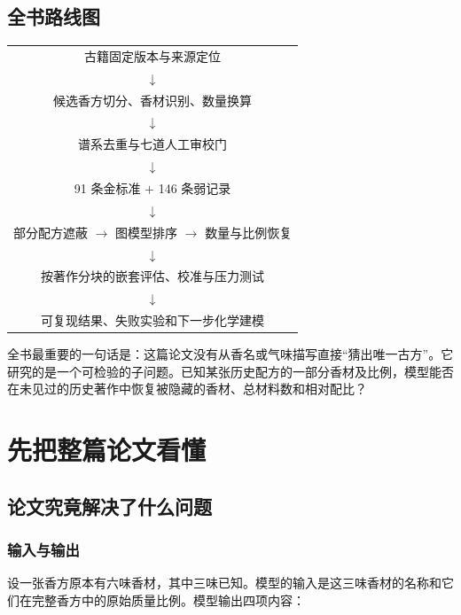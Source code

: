 \documentclass[UTF8,11pt,openany,fontset=none]{ctexbook}
\renewcommand{\arraystretch}{1.18}
\newenvironment{keybox}{\begin{leftbar}\small\noindent}{\end{leftbar}}
\begin{document}
\tableofcontents

\chapter*{全书路线图}

\begin{center}
\renewcommand{\arraystretch}{1.35}
\begin{tabular}{c}
古籍固定版本与来源定位\\
$\downarrow$\\
候选香方切分、香材识别、数量换算\\
$\downarrow$\\
谱系去重与七道人工审校门\\
$\downarrow$\\
91 条金标准 $+$ 146 条弱记录\\
$\downarrow$\\
部分配方遮蔽 $\rightarrow$ 图模型排序 $\rightarrow$ 数量与比例恢复\\
$\downarrow$\\
按著作分块的嵌套评估、校准与压力测试\\
$\downarrow$\\
可复现结果、失败实验和下一步化学建模
\end{tabular}
\end{center}

\begin{keybox}
全书最重要的一句话是：这篇论文没有从香名或气味描写直接“猜出唯一古方”。它研究的是一个可检验的子问题。已知某张历史配方的一部分香材及比例，模型能否在未见过的历史著作中恢复被隐藏的香材、总材料数和相对配比？
\end{keybox}

\mainmatter

\part{先把整篇论文看懂}

\chapter{论文究竟解决了什么问题}

\section{输入与输出}

设一张香方原本有六味香材，其中三味已知。模型的输入是这三味香材的名称和它们在完整香方中的原始质量比例。模型输出四项内容：
\end{document}

